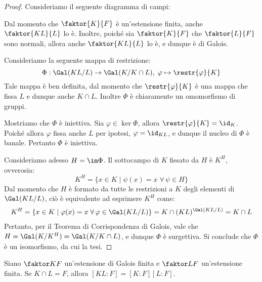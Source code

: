 \documentclass[11pt]{scrartcl}
\begin{document}
	\begin{proof}
		Consideriamo il seguente diagramma di campi:

		\begin{center}
		\end{center}
		
		Dal momento che $\faktor{K}{F}$ è un'estensione finita, anche
		$\faktor{KL}{L}$ lo è. Inoltre, poiché sia $\faktor{K}{F}$ che
		$\faktor{L}{F}$ sono normali, allora anche
		$\faktor{KL}{L}$ lo è, e dunque è di Galois. \medskip
		
		
		Consideriamo la seguente mappa di restrizione:
		\[ \Phi : \Gal(KL/L) \to \Gal(K/K \cap L), \; \varphi \mapsto \restr{\varphi}{K} \]
		Tale mappa è ben definita, dal momento che $\restr{\varphi}{K}$ è una
		mappa che fissa $L$ e dunque anche $K \cap L$. Inoltre $\Phi$ è chiaramente
		un omomorfismo di gruppi. \medskip
		
		
		Mostriamo che $\Phi$ è iniettiva. Sia $\varphi \in \ker \Phi$, allora
		$\restr{\varphi}{K} = \id_K$. Poiché allora $\varphi$ fissa anche
		$L$ per ipotesi, $\varphi = \id_{KL}$, e dunque il nucleo di
		$\Phi$ è banale. Pertanto $\Phi$ è iniettiva. \medskip
		
		
		Consideriamo adesso $H = \im \Phi$. Il sottocampo di $K$ fissato
		da $H$ è $K^H$, ovverosia:
		\[ K^H = \{x \in K \mid \psi(x) = x \; \forall \, \psi \in H \} \]
		Dal momento che $H$ è formato da tutte le restrizioni a $K$ degli
		elementi di $\Gal(KL/L)$, ciò è equivalente ad esprimere $K^H$
		come:
		\begin{multline*}
			 K^H = \{x \in K \mid \varphi(x) = x \; \forall \, \varphi \in \Gal(KL/L)\} =
			 K \cap (KL)^{\Gal(KL/L)} = K \cap L
		\end{multline*}
		Pertanto, per il Teorema di Corrispondenza di Galois, vale che $H = \Gal(K/K^H) = \Gal(K/K \cap L)$, e dunque $\Phi$ è surgettiva. Si conclude che $\Phi$ è
		un isomorfismo, da cui la tesi.
	\end{proof}
	
	\begin{corollary}
		\label{cor:3.14}
		Siano $\faktor K F$ un'estensione di Galois finita e $\faktor L F$ un'estensione finita. Se $K\cap L = F$, allora $[KL:F] = [K:F][L:F]$.
	\end{corollary}
	
\end{document}
